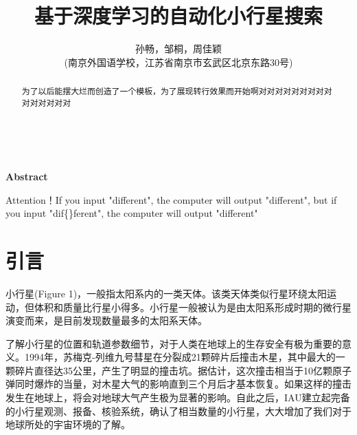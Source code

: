 \documentclass[12pt,a4paper]{article}%
\title{\fontsize{18pt}{27pt}\selectfont%
	{\heiti%
    基于深度学习的自动化小行星搜索}}%
\author{\fontsize{12pt}{18pt}\selectfont%
	{\fangsong%
		孙畅，邹桐，周佳颖 }\\%
	\fontsize{10.5pt}{15.75pt}\selectfont%
	{\fangsong%
		(南京外国语学校，江苏省南京市玄武区北京东路30号)}}%
\date{}%
\begin{document}
\maketitle%
\lhead{}%
\chead{}%
\rhead{}%
\lfoot{}%
\cfoot{\thepage}%
\rfoot{}%
\begin{abstract}
    \fangsong 为了以后能摆大烂而创造了一个模板，为了展现转行效果而开始啊对对对对对对对对对对对对对对对
\end{abstract}

\begin{adjustwidth}{1.06cm}{1.06cm}
    \fontsize{10.5pt}{15.75pt}\\
\end{adjustwidth}

\begin{center}%
    {\textbf{Abstract}}%
\end{center}
\begin{adjustwidth}{1.06cm}{1.06cm}%
    \hspace{1.5em}Attention！If you input "dif{}ferent", the computer will output "different", but if you input "dif\{\}ferent", the computer will output "dif{}ferent"
\end{adjustwidth}
\newpage%

\tableofcontents

\newpage

\section{引言}

小行星(Figure 1)，一般指太阳系内的一类天体。该类天体类似行星环绕太阳运动，但体积和质量比行星小得多。小行星一般被认为是由太阳系形成时期的微行星演变而来，是目前发现数量最多的太阳系天体。

了解小行星的位置和轨道参数细节，对于人类在地球上的生存安全有极为重要的意义。1994年，苏梅克-列维九号彗星在分裂成21颗碎片后撞击木星，其中最大的一颗碎片直径达35公里，产生了明显的撞击坑。据估计，这次撞击相当于10亿颗原子弹同时爆炸的当量，对木星大气的影响直到三个月后才基本恢复。如果这样的撞击发生在地球上，将会对地球大气产生极为显著的影响。自此之后，IAU建立起完备的小行星观测、报备、核验系统，确认了相当数量的小行星，大大增加了我们对于地球所处的宇宙环境的了解。
\end{document}
